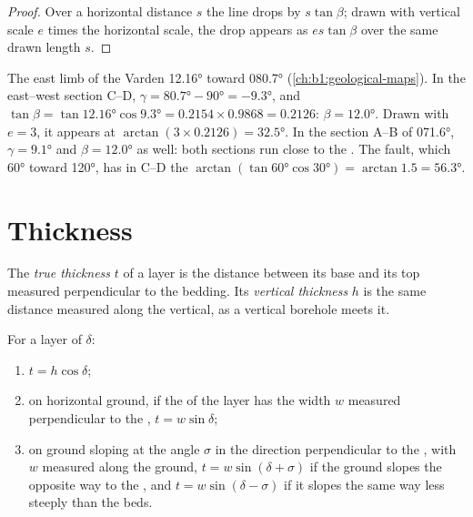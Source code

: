 \begin{proof}
Over a horizontal distance $s$ the line drops by $s\tan\beta$; drawn with
vertical scale $e$ times the horizontal scale, the drop appears as
$es\tan\beta$ over the same drawn length $s$.
\end{proof}

\begin{example}
The east limb of the Varden   \ang{12.16} toward \ang{080.7}
(\cref{ch:b1:geological-maps}). In the east--west section C--D,
$\gamma = \ang{80.7} - \ang{90} = \ang{-9.3}$, and $\tan\beta =
\tan\ang{12.16}\cos\ang{9.3} = 0.2154\times0.9868 = 0.2126$: $\beta =
\ang{12.0}$. Drawn with $e = 3$, it appears at $\arctan(3\times0.2126) =
\ang{32.5}$. In the section A--B of  \ang{071.6}, $\gamma = \ang{9.1}$
and $\beta = \ang{12.0}$ as well: both sections run close to the . The fault, which  \ang{60} toward \ang{120}, has in C--D the
 $\arctan(\tan\ang{60}\cos\ang{30}) = \arctan 1.5 = \ang{56.3}$.
\end{example}

\section{Thickness}

\begin{definition}\label{def:b1:cross-sections:thickness}
The \emph{true thickness} $t$ of a layer is the
distance between its base and its top measured perpendicular to the
bedding. Its \emph{vertical thickness} $h$ is the
same distance measured along the vertical, as a vertical borehole meets it.
\end{definition}

\begin{proposition}\label{prop:b1:cross-sections:thickness}
For a layer of  $\delta$:
\begin{enumerate}
  \item $t = h\cos\delta$;
  \item on horizontal ground, if the  of the layer has the width $w$
        measured perpendicular to the , $t = w\sin\delta$;
  \item on ground sloping at the angle $\sigma$ in the direction
        perpendicular to the , with $w$ measured along the ground,
        $t = w\sin(\delta + \sigma)$ if the ground slopes the opposite way to
        the , and $t = w\sin(\delta - \sigma)$ if it slopes the same way
        less steeply than the beds.
\end{enumerate}
\end{proposition}

